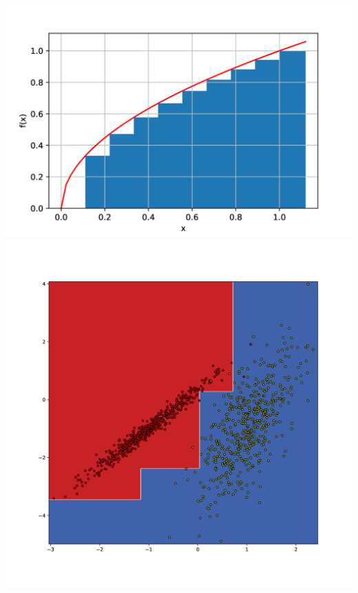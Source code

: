 \documentclass[aspectratio=169,usenames,dvipsnames]{beamer}
\begin{document}
\begin{frame}
\begin{columns}
\begin{minipage}{\linewidth}
\centering
\includegraphics[width=0.8\linewidth]{plot.png}\\
\includegraphics[width=0.8\linewidth]{4gi.png}\\
\end{minipage}
\end{columns}
\end{frame}

\end{document}
